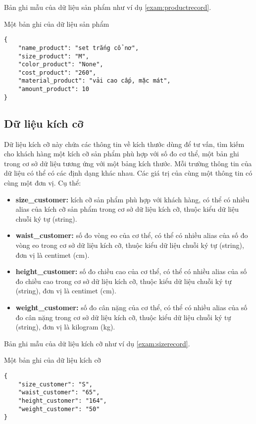Bản ghi mẫu của dữ liệu sản phẩm như ví dụ \ref{exam:productrecord}.

\renewcommand{\textboxenvname}{Ví dụ}
\begin{textbox}{Một bản ghi của dữ liệu sản phẩm}
\begin{Verbatim}[breaklines=true, breakanywhere=true]
{
    "name_product": "set trắng cổ nơ",
    "size_product": "M",
    "color_product": "None",
    "cost_product": "260",
    "material_product": "vải cao cấp, mặc mát",
    "amount_product": 10
}
\end{Verbatim}
\end{textbox}

\subsection{Dữ liệu kích cỡ}
\label{subsec:sizedb}
Dữ liệu kích cỡ này chứa các thông tin về kích thước dùng để tư vấn,
tìm kiếm cho khách hàng một kích cỡ sản phẩm phù hợp với số đo cơ thể,
một bản ghi trong cơ sở dữ liệu tương ứng với một bảng kích thước.
Mỗi trường thông tin của dữ liệu có thể có các định dạng khác nhau.
Các giá trị của cùng một thông tin có cùng một đơn vị. Cụ thể:

\begin{itemize}
    \item \textbf{size\_customer:} kích cỡ sản phẩm phù hợp với
    khách hàng, có thể có nhiều alias của kích cỡ sản phẩm trong
    cơ sở dữ liệu kích cỡ, thuộc kiểu dữ liệu chuỗi ký tự (string).
    \item \textbf{waist\_customer:} số đo vòng eo của cơ thể, có thể
    có nhiều alias của số đo vòng eo trong cơ sở dữ liệu kích cỡ,
    thuộc kiểu dữ liệu chuỗi ký tự (string), đơn vị là centimet (cm).
    \item \textbf{height\_customer:} số đo chiều cao của cơ thể,
    có thể có nhiều alias của số đo chiều cao trong cơ sở dữ liệu
    kích cỡ, thuộc kiểu dữ liệu chuỗi ký tự (string), đơn vị là
    centimet (cm).
    \item \textbf{weight\_customer:} số đo cân nặng của cơ thể,
    có thể có nhiều alias của số đo cân nặng trong cơ sở dữ liệu
    kích cỡ, thuộc kiểu dữ liệu chuỗi ký tự (string), đơn vị là
    kilogram (kg).
\end{itemize}

Bản ghi mẫu của dữ liệu kích cỡ như ví dụ \ref{exam:sizerecord}.

\renewcommand{\textboxenvname}{Ví dụ}
\begin{textbox}{Một bản ghi của dữ liệu kích cỡ}
\begin{Verbatim}[breaklines=true, breakanywhere=true]
{
    "size_customer": "S",
    "waist_customer": "65",
    "height_customer": "164",
    "weight_customer": "50"
}
\end{Verbatim}
\end{textbox}

